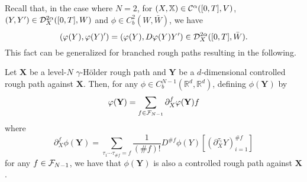 \documentclass[a4paper, 10pt]{style/preprint}
\begin{document}
Recall that, in the case where \(N = 2\), for \((X, \mathbb{X}) \in {\mathcal C}^{\alpha}([0, T], V)\), 
\((Y, Y') \in {\mathcal D}_X^{2\alpha}([0, T], W)\) and \(\phi \in C^2_b(W, \bar W)\), we have 
\[(\varphi(Y), \varphi(Y)') = (\varphi(Y), D\varphi(Y) Y') \in {\mathcal D}_X^{2\alpha}([0, T], \bar W).\]
This fact can be generalized for branched rough paths resulting in the following.

\begin{proposition}\label{prop:comp}
  Let \(\mathbf{X}\) be a level-\(N\) \(\gamma\)-H\"older rough path and \(\mathbf{Y}\) 
  be a \(d\)-dimensional controlled rough path against \(\mathbf{X}\). 
  Then, for any \(\phi \in C^{N - 1}_b(\mathbb{R}^d, \mathbb{R}^d)\), defining \(\phi(\mathbf{Y})\) by
  \[\varphi(\mathbf{Y}) = \sum_{f \in {\mathcal F}_{N - 1}} \partial^f_X \varphi(\mathbf{Y}) f\]
  where 
  \[\partial^f_X \phi(\mathbf{Y}) = \sum_{\tau_1 \cdots \tau_{\# f} = f} \frac{1}{(\# f)!}D^{\# f} 
      \phi(Y)[(\partial^{\tau_i}_X Y)_{i = 1}^{\# f}]\]
  for any \(f \in {\mathcal F}_{N - 1}\), we have that \(\phi(\mathbf{Y})\) is 
  also a controlled rough path against \(\mathbf{X}\).
\end{proposition}
\end{document}
